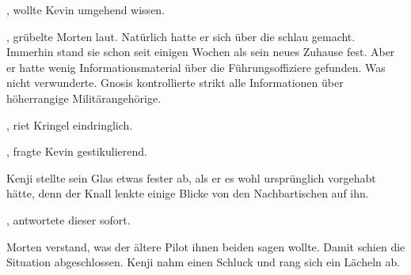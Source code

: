 , wollte Kevin umgehend wissen.

\par


\par

, grübelte Morten laut.  Natürlich hatte er sich über die  schlau gemacht. Immerhin stand sie schon seit einigen Wochen als sein neues Zuhause fest. Aber er hatte wenig Informationsmaterial über die Führungsoffiziere gefunden. Was nicht verwunderte. Gnosis kontrollierte strikt alle Informationen über höherrangige Militärangehörige. 

\par

, riet Kringel eindringlich.

\par

, fragte Kevin gestikulierend. 

\par

Kenji stellte sein Glas etwas fester ab, als er es wohl ursprünglich vorgehabt hätte, denn der Knall lenkte einige Blicke von den Nachbartischen auf ihn. 

\par

, antwortete dieser sofort.

\par


\par

Morten verstand, was der ältere Pilot ihnen beiden sagen wollte.  Damit schien die Situation abgeschlossen. Kenji nahm einen Schluck und rang sich ein Lächeln ab.

